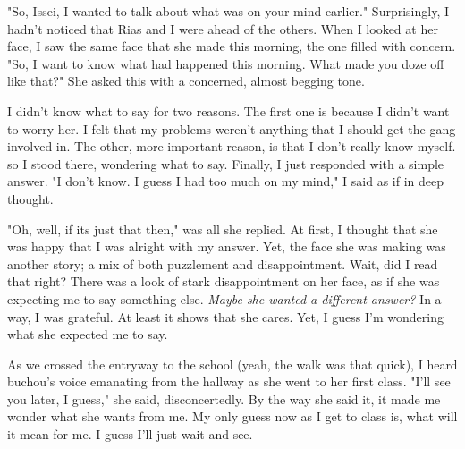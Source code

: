 \documentclass{article}
\begin{document}
"So, Issei, I wanted to talk about what was on your mind earlier." Surprisingly, I hadn't noticed that Rias and I were ahead of the others. When I looked at her face, I saw the same face that she made this morning, the one filled with concern. "So, I want to know what had happened this morning. What made you doze off like that?" She asked this with a concerned, almost begging tone.

I didn't know what to say for two reasons. The first one is because I didn't want to worry her. I felt that my problems weren't anything that I should get the gang involved in. The other, more important reason, is that I don't really know myself. so I stood there, wondering what to say. Finally, I just responded with a simple answer. "I don't know. I guess I had too much on my mind," I said as if in deep thought.

"Oh, well, if its just that then," was all she replied. At first, I thought that she was happy that I was alright with my answer. Yet, the face she was making was another story; a mix of both puzzlement and disappointment. Wait, did I read that right? There was a look of stark disappointment on her face, as if she was expecting me to say something else. \emph{Maybe she wanted a different answer?} In a way, I was grateful. At least it shows that she cares. Yet, I guess I'm wondering what she expected me to say.

As we crossed the entryway to the school (yeah, the walk was that quick), I heard buchou's voice emanating from the hallway as she went to her first class. "I'll see you later, I guess," she said, disconcertedly. By the way she said it, it made me wonder what she wants from me. My only guess now as I get to class is, what will it mean for me. I guess I'll just wait and see.
\end{document}
